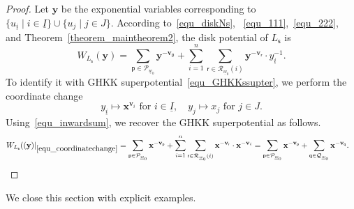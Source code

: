 \documentclass[11pt]{amsart}
\theoremstyle{plain}
\theoremstyle{definition}
\theoremstyle{remark}
\numberwithin{equation}{section} \numberwithin{table}{section}
\numberwithin{equation}{section}
\begin{document}
\begin{proof}
Let $\mathbf{y}$ be the exponential variables corresponding to $\{ u_{\underline{i}} \mid i \in \underline{I} \} \cup \{ u_j \mid j \in J\}$. According to~\eqref{equ_diskNs}, ~\eqref{equ_111},~\eqref{equ_222}, and Theorem~\ref{theorem_maintheorem2}, the disk potential of $L_\mathsf{s}$ is
\begin{equation}\label{equ_lifteddiskpotential}
W_{L_\mathsf{s}}(\mathbf{y}) =  \sum_{\mathsf{p} \in \mathcal{P}_{\underline{w}_0}} \mathbf{y}^{-\mathbf{v}_\mathsf{p}} + \sum_{i=1}^n \sum_{\mathsf{r} \in \mathcal{R}_{\underline{w}_0}(i)}  \mathbf{y}^{-\mathbf{v}_\mathsf{r}} \cdot y^{-1}_{\underline{i}}.
\end{equation}
To identify it with GHKK superpotential~\eqref{equ_GHKKssupter}, we perform the coordinate change 
\begin{equation}\label{equ_coordinatechange}
y_{\underline{i}} \mapsto \mathbf{x}^{\mathbf{v}_i} \mbox{ for $i \in \underline{I}$}, \quad y_j \mapsto x_j \mbox{ for $j \in J$}.
\end{equation}
Using~\eqref{equ_inwardsum}, we recover the GHKK superpotential as follows.
\begin{align*}
W_{L_\mathsf{s}}((\mathbf{y}) |_{\eqref{equ_coordinatechange}} &=  \sum_{\mathsf{p} \in \mathcal{P}_{\underline{w}_0}} \mathbf{x}^{- \mathbf{v}_\mathsf{p}} + \sum_{i=1}^n \sum_{\mathsf{r} \in \mathcal{R}_{\underline{w}_0}(i)}  \mathbf{x}^{-\mathbf{v}_\mathsf{r}} \cdot {\mathbf{x}^{-\mathbf{v}_i}} = \sum_{\mathsf{p} \in \mathcal{P}_{\underline{w}_0}} \mathbf{x}^{- \mathbf{v}_\mathsf{p}} + \sum_{\mathsf{q} \in \mathcal{Q}_{\underline{w}_0}}  \mathbf{x}^{-\mathbf{v}_\mathsf{q}}.
\end{align*}
\end{proof}

We close this section with explicit examples.
\end{document}
